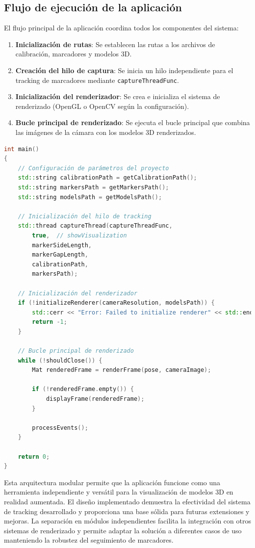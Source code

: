 \subsection{Flujo de ejecución de la aplicación}

El flujo principal de la aplicación coordina todos los componentes del sistema:

\begin{enumerate}
    \item \textbf{Inicialización de rutas}: Se establecen las rutas a los archivos de calibración, marcadores y modelos 3D.
    \item \textbf{Creación del hilo de captura}: Se inicia un hilo independiente para el \gls{tracking} de marcadores mediante \texttt{captureThreadFunc}.
    \item \textbf{Inicialización del renderizador}: Se crea e inicializa el sistema de renderizado (OpenGL o OpenCV según la configuración).
    \item \textbf{Bucle principal de renderizado}: Se ejecuta el bucle principal que combina las imágenes de la cámara con los modelos 3D renderizados.
\end{enumerate}

\begin{lstlisting}[language=C++]
int main()
{
    // Configuración de parámetros del proyecto
    std::string calibrationPath = getCalibrationPath();
    std::string markersPath = getMarkersPath();
    std::string modelsPath = getModelsPath();
    
    // Inicialización del hilo de tracking
    std::thread captureThread(captureThreadFunc, 
        true,  // showVisualization
        markerSideLength, 
        markerGapLength,
        calibrationPath,
        markersPath);
    
    // Inicialización del renderizador
    if (!initializeRenderer(cameraResolution, modelsPath)) {
        std::cerr << "Error: Failed to initialize renderer" << std::endl;
        return -1;
    }
    
    // Bucle principal de renderizado
    while (!shouldClose()) {
        Mat renderedFrame = renderFrame(pose, cameraImage);
        
        if (!renderedFrame.empty()) {
            displayFrame(renderedFrame);
        }
        
        processEvents();
    }
    
    return 0;
}
\end{lstlisting}

Esta arquitectura modular permite que la aplicación funcione como una herramienta independiente y versátil para la visualización de modelos 3D en realidad aumentada. El diseño implementado demuestra la efectividad del sistema de \gls{tracking} desarrollado y proporciona una base sólida para futuras extensiones y mejoras. La separación en módulos independientes facilita la integración con otros sistemas de renderizado y permite adaptar la solución a diferentes casos de uso manteniendo la robustez del seguimiento de marcadores.

